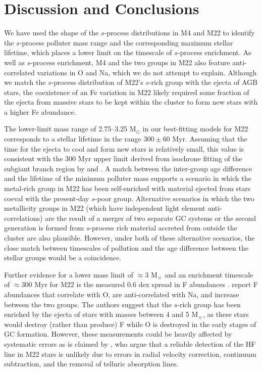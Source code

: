 \section{Discussion and Conclusions}\label{sec:s14discussion}
We have used the shape of the $s$-process distributions in M4 and M22 to identify the $s$-process polluter mass range and the corresponding maximum stellar lifetime, which places a lower limit on the timescale of $s$-process enrichment. As well as $s$-process enrichment, M4 and the two groups in M22 also feature anti-correlated variations in O and Na, which we do not attempt to explain. Although we match the $s$-process distribution of M22's $s$-rich group with the ejecta of AGB stars, the coexistence of an Fe variation in M22 likely required some fraction of the ejecta from massive stars to be kept within the cluster to form new stars with a higher Fe abundance.

The lower-limit mass range of 2.75--3.25 M$_\odot$ in our best-fitting models for M22 corresponds to a stellar lifetime in the range $300 \pm 60$ Myr. Assuming that the time for the ejecta to cool and form new stars is relatively small, this value is consistent with the 300 Myr upper limit derived from isochrone fitting of the subgiant branch region by \citet{Marino:2012db} and \citet{Joo:2013dr}. A match between the inter-group age difference and the lifetime of the minimum polluter mass supports a scenario in which the metal-rich group in M22 has been self-enriched with material ejected from stars coeval with the present-day $s$-poor group. Alternative scenarios in which the two metallicity groups in M22 (which have independent light element anti-correlations) are the result of a merger of two separate GC systems or the second generation is formed from $s$-process rich material accreted from outside the cluster are also plausible. However, under both of these alternative scenarios, the close match between timescales of pollution and the age difference between the stellar groups would be a coincidence.

Further evidence for a lower mass limit of $\approx 3$ M$_\sun$ and an enrichment timescale of $\approx300$ Myr for M22 is the measured 0.6 dex spread in F abundances \citep{AlvesBrito:2012hy,DOrazi:2013dm}. \citet{DOrazi:2013dm} report F abundances that correlate with O, are anti-correlated with Na, and increase between the two groups. The authors suggest that the $s$-rich group has been enriched by the ejecta of stars with masses between 4 and 5 M$_\sun$, as these stars would destroy (rather than produce) F while O is destroyed in the early stages of GC formation. However, these measurements could be heavily affected by systematic errors as is claimed by \citet{deLaverny:2013it}, who argue that a reliable detection of the HF line in M22 stars is unlikely due to errors in radial velocity correction, continuum subtraction, and the removal of telluric absorption lines.

